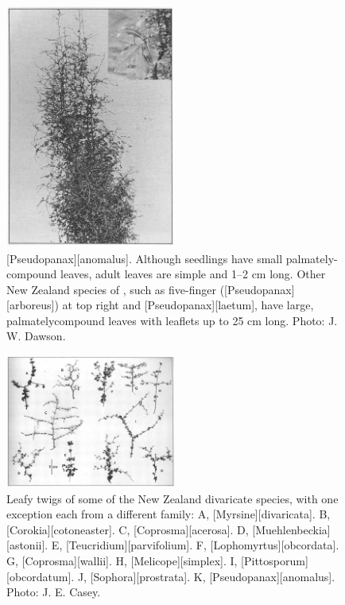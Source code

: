 \begin{figure}
	\includegraphics[width=0.5\textwidth]{graphics/figure76pseudopanax.jpg}
	\centering
	\caption[\emph{Pseudopanax anomalus}]{[Pseudopanax][anomalus].
	Although seedlings have small palmately-compound leaves, adult leaves are simple and 1--2 cm long.
	Other New Zealand species of , such as five-finger ([Pseudopanax][arboreus]) at top right and [Pseudopanax][laetum], have large, palmatelycompound leaves with leaflets up to 25 cm long. Photo:  J. W. Dawson.}%
	\label{fig:76pseudopanax}
\end{figure}

\begin{figure}
	\includegraphics[width=0.5\textwidth]{graphics/figure77twigs.jpg}
	\centering
	\caption[Leafy twigs of some of the New Zealand divaricate species]{Leafy twigs of some of the New Zealand divaricate species, with one exception each from a different family: A, [Myrsine][divaricata].
	B, [Corokia][cotoneaster].
	C, [Coprosma][acerosa].
	D, [Muehlenbeckia][astonii].
	E, [Teucridium][parvifolium].
	F, [Lophomyrtus][obcordata].
	G, [Coprosma][wallii].
	H, [Melicope][simplex].
	I, [Pittosporum][obcordatum].
	J, [Sophora][prostrata].
	K, [Pseudopanax][anomalus].
	Photo:  J. E. Casey.}%
	\label{fig:77twigs}
\end{figure}

